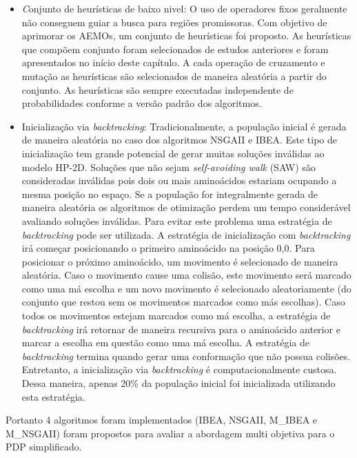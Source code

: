  
 \begin{itemize}
 		
		\item \textit Conjunto de heurísticas de baixo nivel: O uso de operadores fixos geralmente não conseguem guiar a busca para regiões promissoras. 
		Com objetivo de aprimorar os AEMOs, um conjunto de heurísticas foi proposto. As heurísticas que compõem conjunto foram selecionados de estudos anteriores e foram apresentados no início deste capítulo. A cada operação de cruzamento e mutação as heurísticas são selecionados de maneira aleatória a partir do conjunto. As heurísticas são sempre executadas independente de probabilidades conforme a versão padrão dos algoritmos. 
	
		
		\item Inicialização via \textit{backtracking}: Tradicionalmente, a população inicial é gerada de maneira aleatória no caso dos algoritmos NSGAII e IBEA. Este tipo de inicialização tem grande potencial de gerar muitas soluções inválidas ao  modelo HP-2D. Soluções que não sejam \textit{self-avoiding walk} (SAW) são consideradas inválidas pois dois ou mais aminoácidos estariam ocupando a mesma posição no espaço. Se a população for integralmente gerada de maneira aleatória os algoritmos de otimização perdem um tempo considerável avaliando soluções inválidas. Para evitar este problema uma estratégia de \textit{backtracking} pode ser utilizada. A estratégia de inicialização com \textit{backtracking} irá começar posicionando o primeiro aminoácido na posição 0,0. Para posicionar o próximo aminoácido, um movimento é selecionado de maneira aleatória. Caso o movimento cause uma colisão, este movimento será marcado como uma má escolha e um novo movimento é selecionado aleatoriamente (do conjunto que restou sem os movimentos marcados como más escolhas). Caso todos os movimentos estejam marcados como má escolha, a estratégia de \textit{backtracking} irá retornar de maneira recursiva para o aminoácido anterior e marcar a escolha em questão como uma má escolha. A estratégia de \textit{backtracking} termina quando gerar uma conformação que não possua colisões. Entretanto, a inicialização via \textit{backtracking} é computacionalmente custosa. Dessa maneira, apenas 20\% da população inicial foi inicializada utilizando esta estratégia.

\end{itemize}

Portanto 4 algoritmos foram implementados (IBEA, NSGAII, M\_IBEA e M\_NSGAII) foram propostos para avaliar a abordagem multi objetiva para o PDP simplificado.


